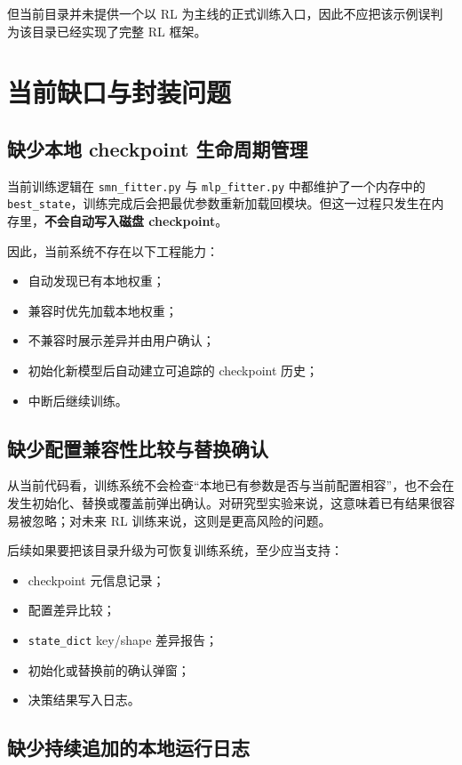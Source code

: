 \documentclass[11pt,fontset=none]{ctexart}
\begin{document}
但当前目录并未提供一个以 RL 为主线的正式训练入口，因此不应把该示例误判为该目录已经实现了完整 RL 框架。

\section{当前缺口与封装问题}

\subsection{缺少本地 checkpoint 生命周期管理}

当前训练逻辑在 \texttt{smn\_fitter.py} 与 \texttt{mlp\_fitter.py} 中都维护了一个内存中的 \texttt{best\_state}，训练完成后会把最优参数重新加载回模块。但这一过程只发生在内存里，\textbf{不会自动写入磁盘 checkpoint}。

因此，当前系统不存在以下工程能力：
\begin{itemize}[leftmargin=2em]
  \item 自动发现已有本地权重；
  \item 兼容时优先加载本地权重；
  \item 不兼容时展示差异并由用户确认；
  \item 初始化新模型后自动建立可追踪的 checkpoint 历史；
  \item 中断后继续训练。
\end{itemize}

\subsection{缺少配置兼容性比较与替换确认}

从当前代码看，训练系统不会检查“本地已有参数是否与当前配置相容”，也不会在发生初始化、替换或覆盖前弹出确认。对研究型实验来说，这意味着已有结果很容易被忽略；对未来 RL 训练来说，这则是更高风险的问题。

后续如果要把该目录升级为可恢复训练系统，至少应当支持：
\begin{itemize}[leftmargin=2em]
  \item checkpoint 元信息记录；
  \item 配置差异比较；
  \item \texttt{state\_dict} key/shape 差异报告；
  \item 初始化或替换前的确认弹窗；
  \item 决策结果写入日志。
\end{itemize}

\subsection{缺少持续追加的本地运行日志}
\end{document}
